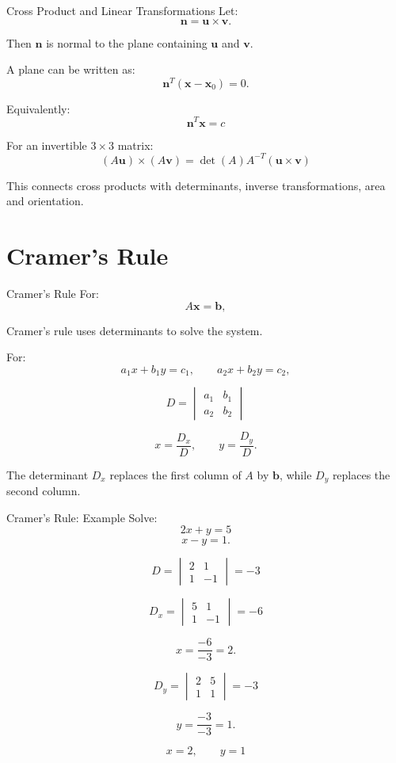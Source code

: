 \documentclass[aspectratio=169]{beamer}
\begin{document}
\begin{frame}{Cross Product and Linear Transformations}
Let:
\[
\mathbf n=\mathbf u\times\mathbf v.
\]

Then $\mathbf n$ is normal to the plane containing $\mathbf u$ and $\mathbf v$.

A plane can be written as:
\[
\mathbf n^T(\mathbf x-\mathbf x_0)=0.
\]

Equivalently:
\[
\boxed{\mathbf n^T\mathbf x=c}
\]

For an invertible $3\times3$ matrix:
\[
\boxed{
(A\mathbf u)\times(A\mathbf v)
=
\det(A)A^{-T}(\mathbf u\times\mathbf v)
}
\]

This connects cross products with determinants, inverse transformations, area and orientation.
\end{frame}

\section{Cramer's Rule}

\begin{frame}{Cramer's Rule}
For:
\[
A\mathbf x=\mathbf b,
\]

Cramer's rule uses determinants to solve the system.

For:
\[
a_1x+b_1y=c_1,
\qquad
a_2x+b_2y=c_2,
\]

\[
D=
\begin{vmatrix}
a_1&b_1\\
a_2&b_2
\end{vmatrix}
\]

\[
x=\frac{D_x}{D},
\qquad
y=\frac{D_y}{D}.
\]

The determinant $D_x$ replaces the first column of $A$ by $\mathbf b$, while $D_y$ replaces the second column.
\end{frame}

\begin{frame}{Cramer's Rule: Example}
Solve:
\[
2x+y=5
\]
\[
x-y=1.
\]

\[
D=
\begin{vmatrix}
2&1\\1&-1
\end{vmatrix}
=-3
\]

\[
D_x=
\begin{vmatrix}
5&1\\1&-1
\end{vmatrix}
=-6
\]

\[
x=\frac{-6}{-3}=2.
\]

\[
D_y=
\begin{vmatrix}
2&5\\1&1
\end{vmatrix}
=-3
\]

\[
y=\frac{-3}{-3}=1.
\]

\[
\boxed{x=2,\qquad y=1}
\]
\end{frame}
\end{document}

